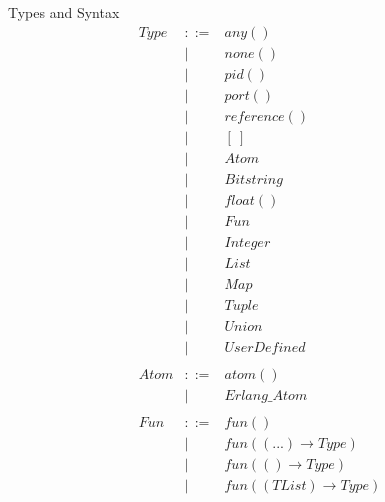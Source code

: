 \documentclass{amsart}
\begin{document}
\begin{section}{Types and Syntax}
\[
\begin{array}{lcl}
  Type & ::= & any()\\           
  & \mid &  none()  \\              
  & \mid & pid()\\
  & \mid & port()\\
  & \mid & reference()\\
  & \mid & [\ ]       \\             
  & \mid & Atom\\
  & \mid & Bitstring\\
  & \mid & float()\\
  & \mid & Fun\\
  & \mid & Integer\\
  & \mid & List\\
  & \mid & Map\\
  & \mid & Tuple\\
  & \mid & Union\\
  & \mid & UserDefined \\
\\
  Atom & ::= & atom()\\
  & \mid & Erlang\_Atom \\

\\
  Fun & ::= & fun()\\
  & \mid & fun((...) \to Type)\\
  & \mid & fun(() \to Type)\\
  & \mid & fun((TList) \to Type)\\





\end{array}\]
\end{section}
\end{document}
